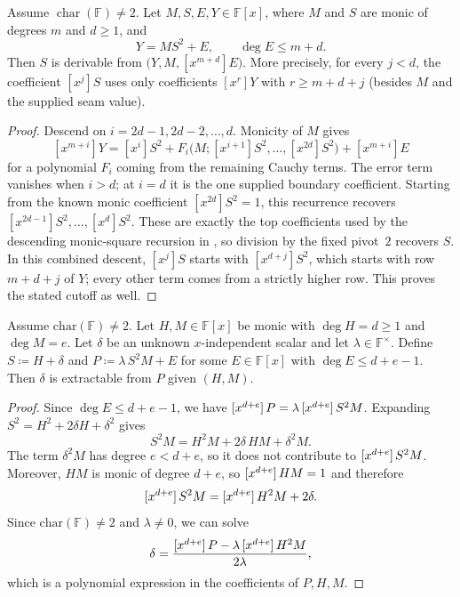 \begin{lemma}\label{lem:relative-square-shell}
    Assume $\operatorname{char}(\mathbb F)\ne2$.  Let $M,S,E,Y\in\mathbb
    F[x]$, where $M$ and $S$ are monic of degrees $m$ and $d\ge1$, and
    \[
       Y=M S^2+E,\qquad \deg E\le m+d.
    \]
    Then $S$ is derivable from
    \(
      \bigl(Y,M,[x^{m+d}]E\bigr).
    \)
    More precisely, for every $j<d$, the coefficient $[x^j]S$ uses only
    coefficients $[x^r]Y$ with $r\ge m+d+j$ (besides $M$ and the supplied
    seam value).
\end{lemma}
\begin{proof}
    Descend on $i=2d-1,2d-2,\ldots,d$.  Monicity of $M$ gives
    \[
      [x^{m+i}]Y=[x^i]S^2+
        F_i\bigl(M;[x^{i+1}]S^2,\ldots,[x^{2d}]S^2\bigr)
        +[x^{m+i}]E
    \]
    for a polynomial $F_i$ coming from the remaining Cauchy terms.  The error
    term vanishes when $i>d$; at $i=d$ it is the one supplied boundary
    coefficient.  Starting from the known monic coefficient
    $[x^{2d}]S^2=1$, this recurrence recovers
    $[x^{2d-1}]S^2,\ldots,[x^d]S^2$.  These are exactly the top coefficients
    used by the descending monic-square recursion in
    , so division by the fixed pivot~$2$ recovers
    $S$.  In this combined descent, $[x^j]S$ starts with
    $[x^{d+j}]S^2$, which starts with row $m+d+j$ of $Y$; every other term
    comes from a strictly higher row.  This proves the stated cutoff as well.
\end{proof}

\begin{lemma}\label{lem:scalar-shift-square}
    Assume $\mathrm{char}(\mathbb{F})\ne 2$.
    Let $H,M\in\mathbb{F}[x]$ be monic with $\deg H=d\ge 1$ and $\deg M=e$.
    Let $\delta$ be an unknown $x$-independent scalar and let
    $\lambda\in\mathbb{F}^\times$.
    Define $S\coloneqq H+\delta$ and $P\coloneqq \lambda\,S^2M+E$ for some $E\in\mathbb{F}[x]$ with $\deg E\le d+e-1$.
    Then $\delta$ is extractable from $P$ given $(H,M)$.
\end{lemma}
\begin{proof}
    Since $\deg E\le d+e-1$, we have $\coeff{P}{d+e}=\lambda\,\coeff{S^2M}{d+e}$.
    Expanding $S^2=H^2+2\delta H+\delta^2$ gives
    \[
      S^2M = H^2M + 2\delta\,HM + \delta^2M.
    \]
    The term $\delta^2M$ has degree $e<d+e$, so it does not contribute to $\coeff{S^2M}{d+e}$.
    Moreover, $HM$ is monic of degree $d+e$, so $\coeff{HM}{d+e}=1$ and therefore
    \[
      \coeff{S^2M}{d+e}=\coeff{H^2M}{d+e}+2\delta.
    \]
    Since $\mathrm{char}(\mathbb{F})\ne 2$ and $\lambda\ne 0$, we can solve
    \[
      \delta=\frac{\coeff{P}{d+e}-\lambda\,\coeff{H^2M}{d+e}}{2\lambda},
    \]
    which is a polynomial expression in the coefficients of $P,H,M$.
\end{proof}

